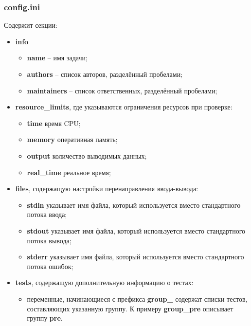\subsubsection{config.ini}
Содержит секции:
\begin{itemize}
    \item \textbf{info}
        \begin{itemize}
            \item \textbf{name} -- имя задачи;
            \item \textbf{authors} -- список авторов, разделённый пробелами;
            \item \textbf{maintainers} -- список ответственных, разделённый пробелами;
        \end{itemize}
    \item \textbf{resource\_limits}, где указываются ограничения ресурсов при проверке:
        \begin{itemize}
            \item \textbf{time} время CPU;
            \item \textbf{memory} оперативная память;
            \item \textbf{output} количество выводимых данных;
            \item \textbf{real\_time} реальное время;
        \end{itemize}
    \item \textbf{files}, содержащую настройки перенаправления ввода-вывода:
        \begin{itemize}
            \item \textbf{stdin} указывает имя файла,
                который используется вместо стандартного потока ввода;
            \item \textbf{stdout} указывает имя файла,
                который используется вместо стандартного потока вывода;
            \item \textbf{stderr} указывает имя файла,
                который используется вместо стандартного потока ошибок;
        \end{itemize}
    \item \textbf{tests}, содержащую дополнительную информацию о тестах:
        \begin{itemize}
            \item переменные, начинающиеся с префикса \textbf{group\_}
                содержат списки тестов, составляющих указанную группу.
                К примеру \textbf{group\_pre} описывает группу \textbf{pre}.
        \end{itemize}
\end{itemize}

